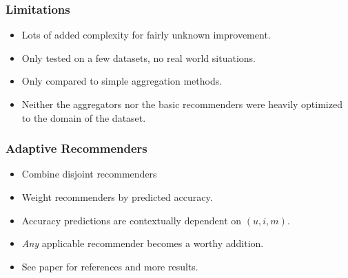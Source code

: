 \documentclass[screen]{beamer}
\begin{document}
\begin{frame}
  
\end{frame}

\begin{frame}
  
\end{frame}

\begin{frame}
  
\end{frame}

\begin{frame}
  \frametitle{Limitations}
  \begin{itemize}
    \item Lots of added complexity for fairly unknown improvement.
    \item Only tested on a few datasets, no real world situations.
    \item Only compared to simple aggregation methods.
    \item Neither the aggregators nor the basic recommenders were
      heavily optimized to the domain of the dataset.
  \end{itemize}
\end{frame}

\begin{frame}
  \frametitle{Adaptive Recommenders}
  \begin{itemize}
    \item Combine disjoint recommenders
    \item Weight recommenders by predicted accuracy.
    \item Accuracy predictions are contextually dependent on $(u,i,m)$.
    \item \emph{Any} applicable recommender becomes a worthy addition.
    \item See paper for references and more results.
  \end{itemize}
\end{frame}
\end{document}
